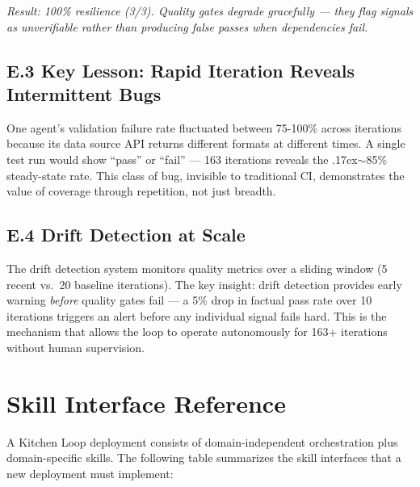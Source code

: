 \documentclass[11pt,a4paper]{article}
\newcommand{\roughly}{{\textraisebox{.17ex}{$\scriptstyle\sim$}}}
\newcommand{\textraisebox}[2]{\leavevmode\raise#1\hbox{#2}}
\begin{document}
\emph{Result: 100\% resilience (3/3). Quality gates degrade gracefully --- they flag signals as unverifiable rather than producing false passes when dependencies fail.}

\subsection{E.3 Key Lesson: Rapid Iteration Reveals Intermittent Bugs}\label{sec:e.3-key-lesson-rapid-iteration-reveals-intermittent-bugs}

One agent's validation failure rate fluctuated between 75-100\% across iterations because its data source API returns different formats at different times. A single test run would show ``pass'' or ``fail'' --- 163 iterations reveals the \roughly85\% steady-state rate. This class of bug, invisible to traditional CI, demonstrates the value of coverage through repetition, not just breadth.

\subsection{E.4 Drift Detection at Scale}\label{sec:e.4-drift-detection-at-scale}

The drift detection system monitors quality metrics over a sliding window (5 recent vs.\ 20 baseline iterations). The key insight: drift detection provides early warning \emph{before} quality gates fail --- a 5\% drop in factual pass rate over 10 iterations triggers an alert before any individual signal fails hard. This is the mechanism that allows the loop to operate autonomously for 163+ iterations without human supervision.

\section{Skill Interface Reference}\label{sec:appendix-f-skill-interface-reference}

A Kitchen Loop deployment consists of domain-independent orchestration plus domain-specific skills. The following table summarizes the skill interfaces that a new deployment must implement:
\end{document}
